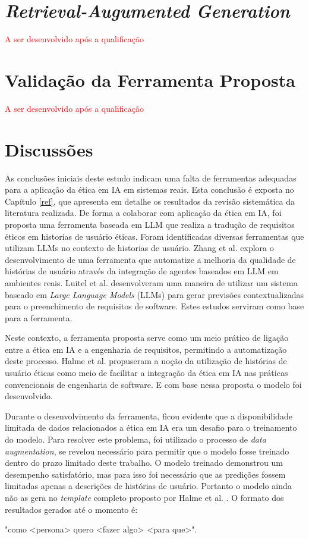\section{\textit{Retrieval-Augumented Generation}}

\textcolor{red}{A ser desenvolvido após a qualificação} 

\section{Validação da Ferramenta Proposta} 

\textcolor{red}{A ser desenvolvido após a qualificação} 

\section{Discussões}
 
As conclusões iniciais deste estudo indicam uma falta de ferramentas adequadas para a aplicação da ética em \acrshort{IA} em sistemas reais. Esta conclusão é exposta no Capítulo \ref{ref}, que apresenta em detalhe os resultados da revisão sistemática da literatura realizada. De forma a colaborar com aplicação da ética em \acrshort{IA}, foi proposta uma ferramenta baseada em LLM que realiza a tradução de requisitos éticos em historias de usuário éticas.
Foram identificadas diversas ferramentas que utilizam LLMs no contexto de historias de usuário. Zhang et al. \cite{zheying} explora o desenvolvimento de uma ferramenta que automatize a melhoria da qualidade de histórias de usuário através da integração de agentes baseados em LLM em ambientes reais. Luitel et al. \cite{luitel} desenvolveram uma maneira de utilizar um sistema baseado em \emph{Large Language Models} (LLMs) para gerar previsões contextualizadas para o preenchimento de requisitos de software. Estes estudos serviram como base para a ferramenta.

Neste contexto, a ferramenta proposta serve como um meio prático de ligação entre a ética em \acrshort{IA} e a engenharia de requisitos, permitindo a automatização deste processo. Halme et al. \cite{halme} propuseram a noção da utilização de histórias de usuário éticas como meio de facilitar a integração da ética em \acrshort{IA} nas práticas convencionais de engenharia de software. E com base nessa proposta o modelo foi desenvolvido. 

Durante o desenvolvimento da ferramenta, ficou evidente que a disponibilidade limitada de dados relacionados a ética em \acrshort{IA} era um desafio para o treinamento do modelo. Para resolver este problema, foi utilizado o processo de \textit{data augmentation}, se revelou necessário para permitir que o modelo fosse treinado dentro do prazo limitado deste trabalho. O modelo treinado demonstrou um desempenho satisfatório, mas para isso foi necessário que as predições fossem limitadas apenas a descrições de histórias de usuário. Portanto o modelo ainda não as gera no \textit{template} completo proposto por Halme et al. \cite{halme}. O formato dos resultados gerados até o momento é:
\begin{center}    
"como <persona> quero <fazer algo> <para que>".
\end{center}
